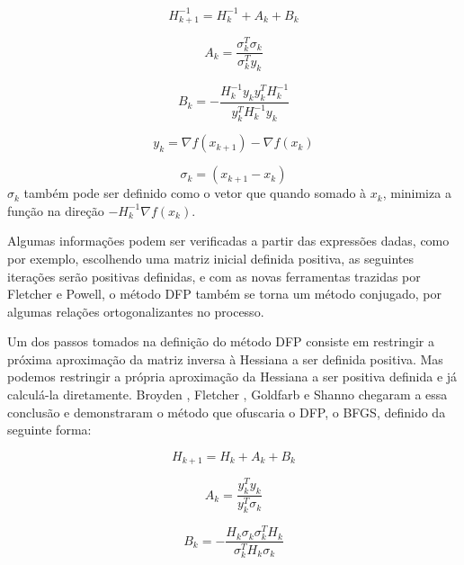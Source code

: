 \begin{equation}
H^{-1}_{k+1} = H^{-1}_{k} + A_k + B_k
\end{equation}

\begin{equation}
A_k =  \frac{\sigma_k^T \sigma_k}{\sigma_k^T y_k}
\end{equation}

\begin{equation}
B_k = - \frac{   H^{-1}_k y_k y^T_k  H^{-1}_k  }{ y^T_k H^{-1}_k y_k}
\end{equation}

\begin{equation}
y_k = \nabla f(x_{k+1}) - \nabla f(x_k)
\end{equation}

\begin{equation}
\sigma_k = (x_{k+1} - x_k)
\end{equation}
\(\sigma_k\) também pode ser definido como o vetor que quando somado à \(x_k\), minimiza a função
na direção \(-H^{-1}_k \nabla f(x_k)\).

Algumas informações podem ser verificadas a partir das expressões dadas, como por exemplo, escolhendo uma
matriz inicial definida positiva, as seguintes iterações serão positivas definidas, e com
as novas ferramentas trazidas por Fletcher e Powell, o método DFP também se torna um método
conjugado, por algumas relações ortogonalizantes no processo.

Um dos passos tomados na definição do método DFP consiste em restringir a próxima aproximação da matriz
inversa à Hessiana a ser definida positiva. Mas podemos restringir a própria aproximação da
Hessiana a ser positiva definida e já calculá-la diretamente. Broyden \cite{BROYDEN_1970},
Fletcher \cite{Fletcher_1970}, Goldfarb \cite{Goldfarb_1970} e Shanno \cite{Shanno_1970} chegaram a
essa conclusão e demonstraram o método que ofuscaria o DFP, o BFGS, definido da seguinte forma:


\begin{equation}
H_{k+1} = H_{k} + A_k + B_k
\end{equation}

\begin{equation}
A_k =  \frac{y_k^T y_k}{y_k^T \sigma_k}
\end{equation}

\begin{equation}
B_k = - \frac{   H_k \sigma_k \sigma^T_k  H_k  }{ \sigma^T_k H_k \sigma_k}
\end{equation}

